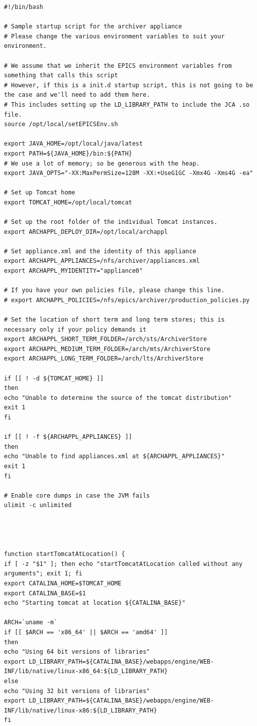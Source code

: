 \documentclass[11pt
  , a4paper
  , article
  , oneside
]{memoir}
\begin{document}
\begin{lstlisting}[style=termstyle]
#!/bin/bash

# Sample startup script for the archiver appliance
# Please change the various environment variables to suit your environment.

# We assume that we inherit the EPICS environment variables from something that calls this script
# However, if this is a init.d startup script, this is not going to be the case and we'll need to add them here.
# This includes setting up the LD_LIBRARY_PATH to include the JCA .so file.
source /opt/local/setEPICSEnv.sh

export JAVA_HOME=/opt/local/java/latest
export PATH=${JAVA_HOME}/bin:${PATH}
# We use a lot of memory; so be generous with the heap. 
export JAVA_OPTS="-XX:MaxPermSize=128M -XX:+UseG1GC -Xmx4G -Xms4G -ea"

# Set up Tomcat home
export TOMCAT_HOME=/opt/local/tomcat

# Set up the root folder of the individual Tomcat instances.
export ARCHAPPL_DEPLOY_DIR=/opt/local/archappl

# Set appliance.xml and the identity of this appliance
export ARCHAPPL_APPLIANCES=/nfs/archiver/appliances.xml
export ARCHAPPL_MYIDENTITY="appliance0"

# If you have your own policies file, please change this line.
# export ARCHAPPL_POLICIES=/nfs/epics/archiver/production_policies.py

# Set the location of short term and long term stores; this is necessary only if your policy demands it
export ARCHAPPL_SHORT_TERM_FOLDER=/arch/sts/ArchiverStore
export ARCHAPPL_MEDIUM_TERM_FOLDER=/arch/mts/ArchiverStore
export ARCHAPPL_LONG_TERM_FOLDER=/arch/lts/ArchiverStore

if [[ ! -d ${TOMCAT_HOME} ]]
then
echo "Unable to determine the source of the tomcat distribution"
exit 1
fi

if [[ ! -f ${ARCHAPPL_APPLIANCES} ]]
then
echo "Unable to find appliances.xml at ${ARCHAPPL_APPLIANCES}"
exit 1
fi

# Enable core dumps in case the JVM fails
ulimit -c unlimited




function startTomcatAtLocation() { 
if [ -z "$1" ]; then echo "startTomcatAtLocation called without any arguments"; exit 1; fi
export CATALINA_HOME=$TOMCAT_HOME
export CATALINA_BASE=$1
echo "Starting tomcat at location ${CATALINA_BASE}"

ARCH=`uname -m`
if [[ $ARCH == 'x86_64' || $ARCH == 'amd64' ]]
then
echo "Using 64 bit versions of libraries"
export LD_LIBRARY_PATH=${CATALINA_BASE}/webapps/engine/WEB-INF/lib/native/linux-x86_64:${LD_LIBRARY_PATH}
else
echo "Using 32 bit versions of libraries"
export LD_LIBRARY_PATH=${CATALINA_BASE}/webapps/engine/WEB-INF/lib/native/linux-x86:${LD_LIBRARY_PATH}
fi


\end{lstlisting}
\end{document}
